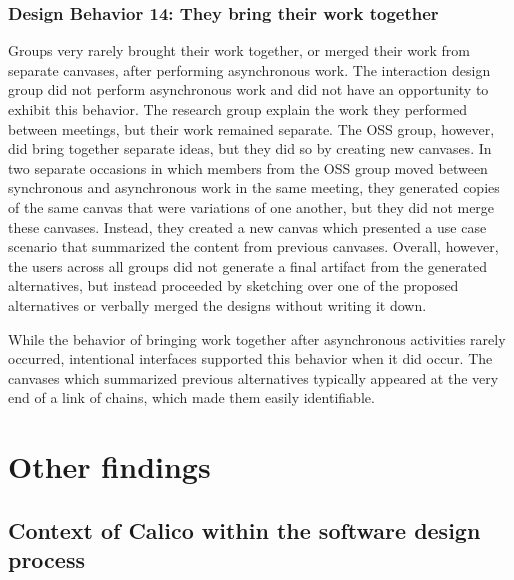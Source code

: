 \subsubsection{Design Behavior 14: They bring their work together}

Groups very rarely brought their work together, or merged their work from separate canvases, after performing asynchronous work. The interaction design group did not perform asynchronous work and did not have an opportunity to exhibit this behavior. The research group explain the work they performed between meetings, but their work remained separate. The OSS group, however, did bring together separate ideas, but they did so by creating new canvases. In two separate occasions in which members from the OSS group moved between synchronous and asynchronous work in the same meeting, they generated copies of the same canvas that were variations of one another, but they did not merge these canvases. Instead, they created a new canvas which presented a use case scenario that summarized the content from previous canvases. Overall, however, the users across all groups did not generate a final artifact from the generated alternatives, but instead proceeded by sketching over one of the proposed alternatives or verbally merged the designs without writing it down.

While the behavior of bringing work together after asynchronous activities rarely occurred, intentional interfaces supported this behavior when it did occur. The canvases which summarized previous alternatives typically appeared at the very end of a link of chains, which made them easily identifiable.


\section{Other findings}
\label{chapter:discussion:other-findings}

\subsection{Context of Calico within the software design process}

